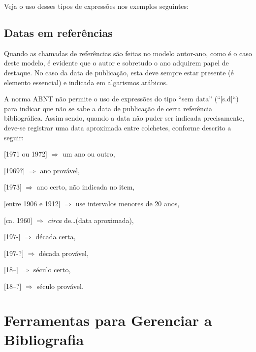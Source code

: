 \begin{apendicesenv}
    Veja o uso desses tipos de expressões nos exemplos seguintes:






    \section{Datas em referências}
    \label{sec_datas_em_referencias}

    Quando as chamadas de referências são feitas no modelo autor-ano, como é o caso deste modelo, é evidente que o autor e sobretudo o ano adquirem papel de destaque.
    No caso da data de publicação, esta deve sempre estar presente (é elemento essencial) e indicada em algarismos arábicos.

    A norma ABNT não permite o uso de expressões do tipo ``sem data'' (``[s.d]``) para indicar que não se sabe a data de publicação de certa referência bibliográfica.
    Assim sendo, quando a data não puder ser indicada precisamente, deve-se registrar uma data aproximada entre colchetes, conforme descrito a seguir:

    [1971 ou 1972] $\Longrightarrow$ um ano ou outro,

    [1969?] $\Longrightarrow$ ano provável,

    [1973] $\Longrightarrow$ ano certo, não indicada no item,

    [entre 1906 e 1912] $\Longrightarrow$ use intervalos menores de 20 anos,

    [ca. 1960] $\Longrightarrow$ \textit{circa} de\ldots (data aproximada),

    [197-] $\Longrightarrow$ década certa,

    [197-?] $\Longrightarrow$ década provável,

    [18--] $\Longrightarrow$ século certo,

    [18--?] $\Longrightarrow$ século provável.

    \chapter{Ferramentas para Gerenciar a Bibliografia}
    \label{chap_ferramenta_para_gerenciar_a_bibliografia}


\end{apendicesenv}
